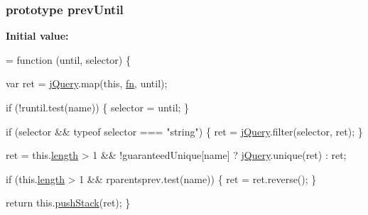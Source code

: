 \subsubsection[{\texorpdfstring{prev\+Until}{prevUntil}}]{ {\bf prototype} prev\+Until}\hypertarget{jquery-2_82_81-vsdoc_8js_a261c6b8aae4b0d984ef1bb06c1caa7d1}{}\label{jquery-2_82_81-vsdoc_8js_a261c6b8aae4b0d984ef1bb06c1caa7d1}
{\bfseries Initial value\+:}
\begin{DoxyCode}
= \textcolor{keyword}{function} (until, selector) \{
        

        var ret = \hyperlink{jquery-2_82_81-vsdoc_8js_add5237586d970a38a81f990e8eb28c6c}{jQuery}.map(\textcolor{keyword}{this}, \hyperlink{jquery-2_82_81-vsdoc_8js_acef6bdaf6b9b20fdcca1ea86f0902c3b}{fn}, until);

        \textcolor{keywordflow}{if} (!runtil.test(name)) \{
            selector = until;
        \}

        \textcolor{keywordflow}{if} (selector && typeof selector === \textcolor{stringliteral}{"string"}) \{
            ret = \hyperlink{jquery-2_82_81-vsdoc_8js_add5237586d970a38a81f990e8eb28c6c}{jQuery}.filter(selector, ret);
        \}

        ret = this.\hyperlink{jquery-2_82_81-vsdoc_8js_aa7de35d58da66d9944ab9cbe82c19640}{length} > 1 && !guaranteedUnique[name] ? \hyperlink{jquery-2_82_81-vsdoc_8js_add5237586d970a38a81f990e8eb28c6c}{jQuery}.unique(ret) : ret;

        \textcolor{keywordflow}{if} (this.\hyperlink{jquery-2_82_81-vsdoc_8js_aa7de35d58da66d9944ab9cbe82c19640}{length} > 1 && rparentsprev.test(name)) \{
            ret = ret.reverse();
        \}

        \textcolor{keywordflow}{return} this.\hyperlink{jquery-2_82_81-vsdoc_8js_afc3a7db1ef2b526338c06c07cecccd44}{pushStack}(ret);
    \}
\end{DoxyCode}
